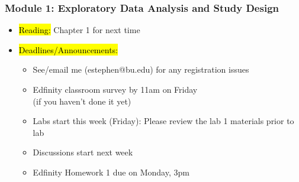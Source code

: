 
\begin{frame}
    \frametitle{Module 1: Exploratory Data Analysis and Study Design}
    \begin{itemize}
        \item \hl{Reading: }Chapter 1 for next time
        \item \hl{Deadlines/Announcements: }
        \begin{itemize}
            \item See/email me (estephen@bu.edu) for any registration issues
            \item Edfinity classroom survey by 11am on Friday \\
            (if you haven't done it yet)
            \item Labs start this week (Friday): Please review the lab 1 materials prior to lab
            \item Discussions start next week
            \item Edfinity Homework 1 due on Monday, 3pm
        \end{itemize}
    \end{itemize}
    
\end{frame}
    
